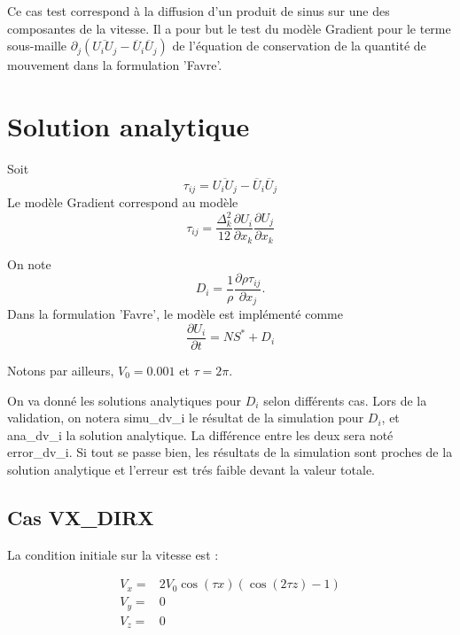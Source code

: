 Ce cas test correspond \`a la diffusion d'un produit de sinus sur une des composantes de la vitesse. Il a pour but le test du mod\`ele Gradient pour le terme sous-maille $\partial_j\left(\overline{U_i U_j} - \overline{U}_i\overline{U}_j\right)$ de l'\'equation de conservation de la quantit\'e de mouvement dans la formulation 'Favre'.

\section{Solution analytique}

Soit
\begin{equation}
\tau_{ij} = \overline{U_i U_j} - \overline{U}_i\overline{U}_j
\end{equation}
Le mod\`ele Gradient correspond au mod\`ele
\begin{equation}
\tau_{ij} = \frac{\Delta_k^2}{12} \frac{\partial U_i}{\partial x_k} \frac{\partial U_j}{\partial x_k}
\end{equation}

On note
\begin{equation}
D_i = \frac{1}{\rho} \frac{\partial \rho \tau_{ij}}{\partial x_j}.
\end{equation}
Dans la formulation 'Favre', le mod\`ele est impl\'ement\'e comme
\begin{equation}
\frac{\partial U_{i}}{\partial t} = NS^* + D_i
\end{equation}

Notons par ailleurs, $V_0 = 0.001$ et $\tau=2\pi$.

On va donn\'e les solutions analytiques pour $D_i$ selon diff\'erents cas.
Lors de la validation, on notera {\textsf simu\_dv\_i} le r\'esultat de la
simulation pour $D_i$, et {\textsf ana\_dv\_i} la solution analytique.
La diff\'erence entre les deux sera not\'e \textsf{error\_dv\_i}. Si tout se passe bien, les r\'esultats de la simulation sont proches de la solution analytique et l'erreur est tr\'es faible devant la valeur totale.



\subsection{Cas VX\_DIRX}

La condition initiale sur la vitesse est :

\begin{align*}
V_x ={}& 2 V_0 \cos(\tau x) (\cos(2 \tau z) - 1) \\
V_y ={}& 0 \\
V_z ={}& 0
\end{align*}

